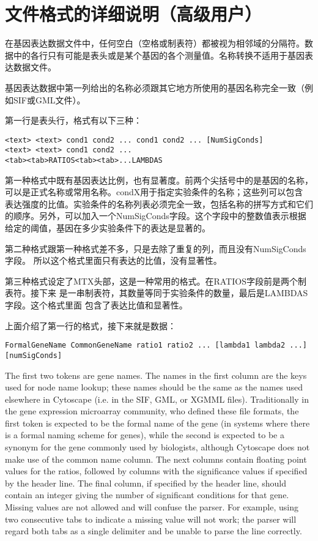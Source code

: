 \section{文件格式的详细说明（高级用户）}
在基因表达数据文件中，任何空白（空格或制表符）都被视为相邻域的分隔符。数据中的各行只有可能是表头或是某个基因的各个测量值。名称转换不适用于基因表达数据文件。

基因表达数据中第一列给出的名称必须跟其它地方所使用的基因名称完全一致（例如SIF或GML文件）。

第一行是表头行，格式有以下三种：
\begin{verbatim}
<text> <text> cond1 cond2 ... cond1 cond2 ... [NumSigConds]
<text> <text> cond1 cond2 ...
<tab><tab>RATIOS<tab><tab>...LAMBDAS
\end{verbatim}
第一种格式中既有基因表达比例，也有显著度。前两个尖括号中的是基因的名称，
可以是正式名称或常用名称。condX用于指定实验条件的名称；这些列可以包含
表达强度的比值。实验条件的名称列表必须完全一致，包括名称的拼写方式和它们
的顺序。另外，可以加入一个NumSigConds字段。这个字段中的整数值表示根据
给定的阈值，基因在多少实验条件下的表达是显著的。

第二种格式跟第一种格式差不多，只是去除了重复的列，而且没有NumSigConds字段。
所以这个格式里面只有表达的比值，没有显著性。

第三种格式设定了MTX头部，这是一种常用的格式。在RATIOS字段前是两个制表符。接下来
是一串制表符，其数量等同于实验条件的数量，最后是LAMBDAS字段。这个格式里面
包含了表达比值和显著性。

上面介绍了第一行的格式，接下来就是数据：
\begin{verbatim}
FormalGeneName CommonGeneName ratio1 ratio2 ... [lambda1 lambda2 ...] [numSigConds]
\end{verbatim}

The first two tokens are gene names. The names in the first column are the keys
used for node name lookup; these names should be the same as the names used
elsewhere in Cytoscape (i.e. in the SIF, GML, or XGMML files). Traditionally in
the gene expression microarray community, who defined these file formats, the
first token is expected to be the formal name of the gene (in systems where
there is a formal naming scheme for genes), while the second is expected to be
a synonym for the gene commonly used by biologists, although Cytoscape does not
make use of the common name column. The next columns contain floating point
values for the ratios, followed by columns with the significance values if
specified by the header line. The final column, if specified by the header
line, should contain an integer giving the number of significant conditions for
that gene. Missing values are not allowed and will confuse the parser. For
example, using two consecutive tabs to indicate a missing value will not work;
the parser will regard both tabs as a single delimiter and be unable to parse
the line correctly. 

